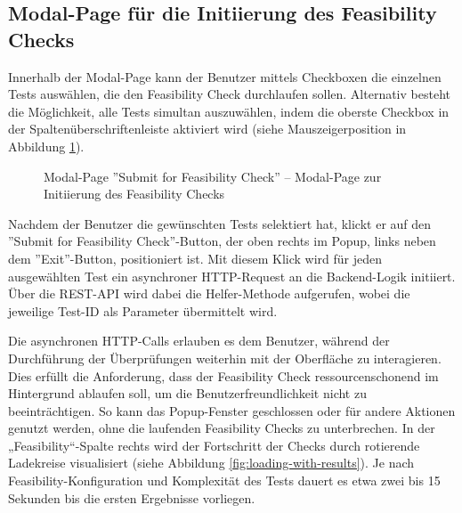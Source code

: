 \subsection{Modal-Page für die Initiierung des Feasibility Checks}

Innerhalb der Modal-Page kann der Benutzer mittels Checkboxen die einzelnen Tests auswählen, die den Feasibility Check durchlaufen sollen. Alternativ besteht die Möglichkeit, alle Tests simultan auszuwählen, indem die oberste Checkbox in der Spaltenüberschriftenleiste aktiviert wird (siehe Mauszeigerposition in Abbildung \ref{fig:submit-page}).

\begin{figure}[!htbp] 
    \centering 
    \caption{Modal-Page ''Submit for Feasibility Check'' – Modal-Page zur Initiierung des Feasibility Checks} 
    \label{fig:submit-page} 
\end{figure}

Nachdem der Benutzer die gewünschten Tests selektiert hat, klickt er auf den \linebreak ''Submit for Feasibility Check''-Button, der oben rechts im Popup, links neben dem ''Exit''-Button, positioniert ist. Mit diesem Klick wird für jeden ausgewählten Test ein asynchroner HTTP-Request an die Backend-Logik initiiert. Über die REST-API wird dabei die Helfer-Methode aufgerufen, wobei die jeweilige Test-ID als Parameter übermittelt wird.

Die asynchronen HTTP-Calls erlauben es dem Benutzer, während der Durchführung der Überprüfungen weiterhin mit der Oberfläche zu interagieren. Dies erfüllt die Anforderung, dass der Feasibility Check ressourcenschonend im Hintergrund ablaufen soll, um die Benutzerfreundlichkeit nicht zu beeinträchtigen. So kann das Popup-Fenster geschlossen oder für andere Aktionen genutzt werden, ohne die laufenden Feasibility Checks zu unterbrechen. In der „Feasibility“-Spalte rechts wird der Fortschritt der Checks durch rotierende Ladekreise visualisiert (siehe Abbildung \ref{fig:loading-with-results}). Je nach Feasibility-Konfiguration und Komplexität des Tests dauert es etwa zwei bis 15 Sekunden bis die ersten Ergebnisse vorliegen.

